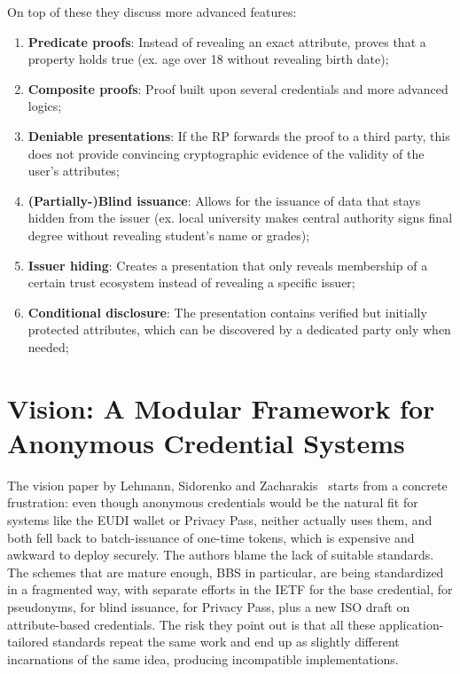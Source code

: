 \documentclass[binding=0.6cm,oneside,noexaminfo]{sapthesis}
\begin{document}
On top of these they discuss more advanced features: 
\begin{enumerate}
      \item \textbf{Predicate proofs}:  Instead of revealing an exact attribute, proves that a property holds true (ex. age over 18 without revealing birth date);
      \item \textbf{Composite proofs}: Proof built upon several credentials and more advanced logics;
      \item \textbf{Deniable presentations}:  If the RP forwards the proof to a third party, this does not provide convincing cryptographic evidence of the validity of the user’s attributes;
      \item \textbf{(Partially-)Blind issuance}: Allows for the issuance of data that stays hidden from the issuer (ex. local university makes central authority signs final degree without revealing student's name or grades);
      \item \textbf{Issuer hiding}: Creates a presentation that only reveals membership of a certain trust ecosystem instead of revealing a specific issuer;
      \item \textbf{Conditional disclosure}: The presentation contains verified but initially protected attributes, which can be discovered by a dedicated party only when needed;
\end{enumerate}

\section{Vision: A Modular Framework for Anonymous Credential Systems}
\label{vision}
The vision paper by Lehmann, Sidorenko and Zacharakis~\cite{Lehmann2025Vision} starts from a concrete frustration: even
though anonymous credentials would be the natural fit for systems like the EUDI wallet or Privacy Pass, neither actually
uses them, and both fell back to batch-issuance of one-time tokens, which is expensive and awkward to deploy securely.
The authors blame the lack of suitable standards. The schemes that are mature enough, BBS in particular, are being
standardized in a fragmented way, with separate efforts in the IETF for the base credential, for pseudonyms, for blind
issuance, for Privacy Pass, plus a new ISO draft on attribute-based credentials. The risk they point out is that all
these application-tailored standards repeat the same work and end up as slightly different incarnations of the same idea,
producing incompatible implementations.
\end{document}
